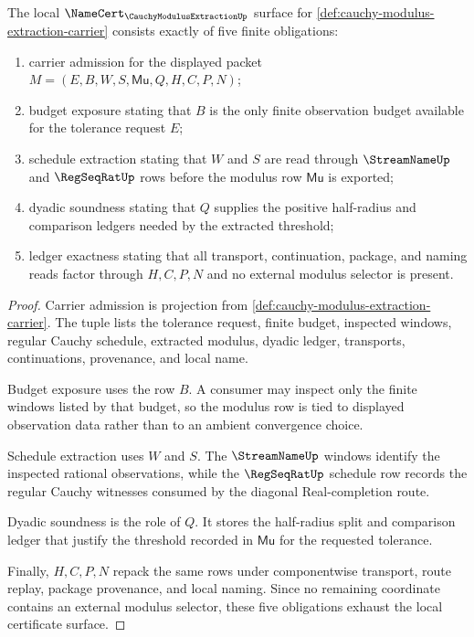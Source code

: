 \begin{theorem}
\label{thm:cauchy-modulus-extraction-namecert-obligations}
The local $\NameCert_{\CauchyModulusExtractionUp}$ surface for \autoref{def:cauchy-modulus-extraction-carrier} consists exactly of five finite obligations:
\begin{enumerate}
\item carrier admission for the displayed packet $M=(E,B,W,S,\mathsf{Mu},Q,H,C,P,N)$;
\item budget exposure stating that $B$ is the only finite observation budget available for the tolerance request $E$;
\item schedule extraction stating that $W$ and $S$ are read through $\StreamNameUp$ and $\RegSeqRatUp$ rows before the modulus row $\mathsf{Mu}$ is exported;
\item dyadic soundness stating that $Q$ supplies the positive half-radius and comparison ledgers needed by the extracted threshold;
\item ledger exactness stating that all transport, continuation, package, and naming reads factor through $H,C,P,N$ and no external modulus selector is present.
\end{enumerate}
\end{theorem}
\begin{proof}
Carrier admission is projection from \autoref{def:cauchy-modulus-extraction-carrier}. The tuple lists the tolerance request, finite budget, inspected windows, regular Cauchy schedule, extracted modulus, dyadic ledger, transports, continuations, provenance, and local name.

Budget exposure uses the row $B$. A consumer may inspect only the finite windows listed by that budget, so the modulus row is tied to displayed observation data rather than to an ambient convergence choice.

Schedule extraction uses $W$ and $S$. The $\StreamNameUp$ windows identify the inspected rational observations, while the $\RegSeqRatUp$ schedule row records the regular Cauchy witnesses consumed by the diagonal Real-completion route.

Dyadic soundness is the role of $Q$. It stores the half-radius split and comparison ledger that justify the threshold recorded in $\mathsf{Mu}$ for the requested tolerance.

Finally, $H,C,P,N$ repack the same rows under componentwise transport, route replay, package provenance, and local naming. Since no remaining coordinate contains an external modulus selector, these five obligations exhaust the local certificate surface.
\end{proof}

